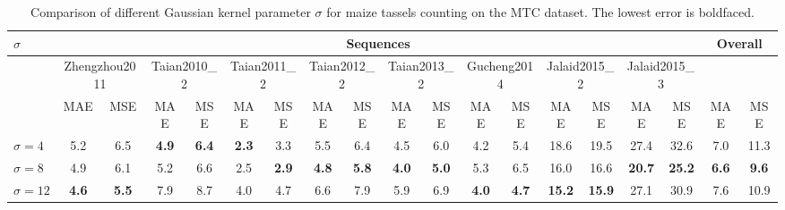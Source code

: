\documentclass[twocolumn]{bmcart}%
\begin{document}
\begin{table*}[!t] \footnotesize
	\centering
	\caption{Comparison of different Gaussian kernel parameter $\sigma$ for maize tassels counting on the MTC dataset. The lowest error is boldfaced.}
	\label{tab:sigma}
	\renewcommand\arraystretch{1.25}
	\addtolength{\tabcolsep}{-3.5pt}
	\begin{tabular}{l|cc|cc|cc|cc|cc|cc|cc|cc|cc}
		\hline
		$\sigma$                & \multicolumn{16}{c|}{Sequences} & \multicolumn{2}{c}{Overall}\\
		\hline
		& \multicolumn{2}{c|}{\scriptsize Zhengzhou2011}  & \multicolumn{2}{c|}{\scriptsize Taian2010\_2} & \multicolumn{2}{c|}{\scriptsize Taian2011\_2} & \multicolumn{2}{c|}{ \scriptsize Taian2012\_2} & \multicolumn{2}{c|}{\scriptsize Taian2013\_2} & \multicolumn{2}{c|}{\scriptsize Gucheng2014} & \multicolumn{2}{c|}{\scriptsize Jalaid2015\_2} & \multicolumn{2}{c|}{\scriptsize Jalaid2015\_3} & \\
		& MAE  & MSE  & MAE  & MSE  & MAE  & MSE  & MAE  & MSE  & MAE  & MSE  & MAE  & MSE  & MAE  & MSE  & MAE  & MSE  & MAE  & MSE \\
		$\sigma=4$ & 5.2 & 6.5 & \textbf{4.9} & \textbf{6.4} & \textbf{2.3} & 3.3 & 5.5 & 6.4 & 4.5 & 6.0 & 4.2 & 5.4 & 18.6 & 19.5 & 27.4 & 32.6 & 7.0 & 11.3\\
		$\sigma=8$ & 4.9 & 6.1 & 5.2 & 6.6 & 2.5 & \textbf{2.9} & \textbf{4.8} & \textbf{5.8} & \textbf{4.0} & \textbf{5.0} & 5.3 & 6.5 & 16.0 & 16.6 & \textbf{20.7} & \textbf{25.2} & \textbf{6.6} & \textbf{9.6}\\
		$\sigma=12$ & \textbf{4.6} & \textbf{5.5} & 7.9 & 8.7 & 4.0 & 4.7 & 6.6 & 7.9 & 5.9 & 6.9 & \textbf{4.0} & \textbf{4.7} & \textbf{15.2} & \textbf{15.9} & 27.1 & 30.9 & 7.6 & 10.9\\
		\hline
	\end{tabular}
\end{table*}
\end{document}
